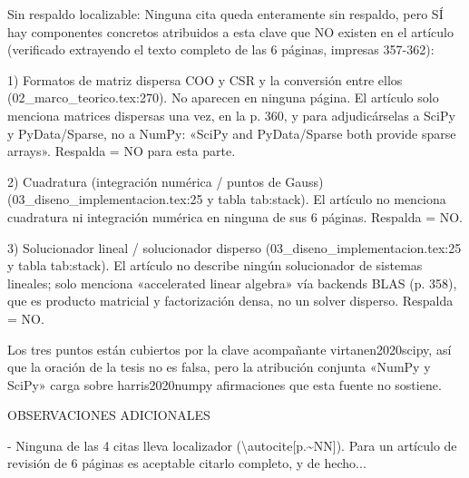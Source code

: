 \documentclass[11pt,a4paper]{article}
\newcommand{\campo}[1]{\textcolor{gris}{\footnotesize #1}}
\begin{document}
{\small\campo{Sin respaldo localizable:} Ninguna cita queda enteramente sin respaldo, pero SÍ hay componentes concretos atribuidos a esta clave que NO existen en el artículo (verificado extrayendo el texto completo de las 6 páginas, impresas 357-362):

1) Formatos de matriz dispersa COO y CSR y la conversión entre ellos (02\_marco\_teorico.tex:270). No aparecen en ninguna página. El artículo solo menciona matrices dispersas una vez, en la p. 360, y para adjudicárselas a SciPy y PyData/Sparse, no a NumPy: «SciPy and PyData/Sparse both provide sparse arrays». Respalda = NO para esta parte.

2) Cuadratura (integración numérica / puntos de Gauss) (03\_diseno\_implementacion.tex:25 y tabla tab:stack). El artículo no menciona cuadratura ni integración numérica en ninguna de sus 6 páginas. Respalda = NO.

3) Solucionador lineal / solucionador disperso (03\_diseno\_implementacion.tex:25 y tabla tab:stack). El artículo no describe ningún solucionador de sistemas lineales; solo menciona «accelerated linear algebra» vía backends BLAS (p. 358), que es producto matricial y factorización densa, no un solver disperso. Respalda = NO.

Los tres puntos están cubiertos por la clave acompañante virtanen2020scipy, así que la oración de la tesis no es falsa, pero la atribución conjunta «NumPy y SciPy» carga sobre harris2020numpy afirmaciones que esta fuente no sostiene.

OBSERVACIONES ADICIONALES

- Ninguna de las 4 citas lleva localizador (\textbackslash{}autocite[p.\textasciitilde{}NN]). Para un artículo de revisión de 6 páginas es aceptable citarlo completo, y de hecho...\par}
\end{document}
